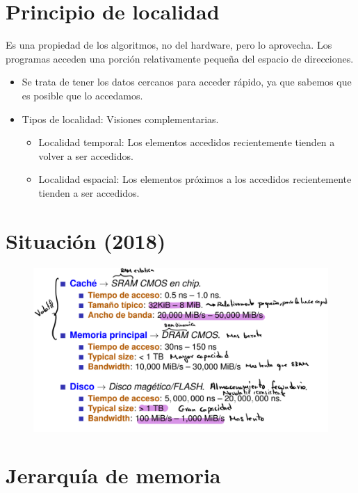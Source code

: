 \documentclass[12pt, twoside, openright]{report} %
\begin{document}
  \section{Principio de localidad}
     Es una propiedad de los algoritmos, no del
    hardware, pero lo aprovecha. Los programas acceden una porción
    relativamente pequeña del espacio de direcciones.

    \begin{itemize}
    
    \item
      Se trata de tener los datos cercanos para acceder rápido, ya que
      sabemos que es posible que lo accedamos.
    \item
      Tipos de localidad: Visiones complementarias.

      \begin{itemize}
      
      \item
        Localidad temporal: Los elementos accedidos recientemente
        tienden a volver a ser accedidos.
      \item
        Localidad espacial: Los elementos próximos a los accedidos
        recientemente tienden a ser accedidos.
      \end{itemize}
    \end{itemize}
  \section{Situación (2018)}
    \begin{figure}[H]
      {\includegraphics[scale=.35]{Untitled 14.png}}
    \end{figure}
    \pagebreak
  \section{Jerarquía de memoria}
\end{document}
